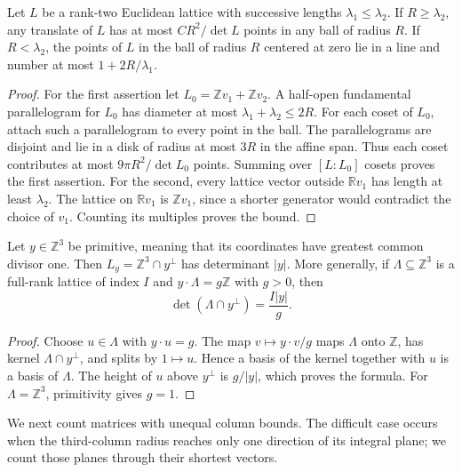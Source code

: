 \begin{lemma}\label{lat:plane-count}
Let $L$ be a rank-two Euclidean lattice with successive lengths
$\lambda_1\le\lambda_2$.  If $R\ge\lambda_2$, any translate of $L$ has
at most $C R^2/\det L$ points in any ball of radius $R$.
If $R<\lambda_2$, the points of $L$ in the ball of radius $R$ centered
at zero lie in a line and number at most $1+2R/\lambda_1$.
\end{lemma}

\begin{proof}
For the first assertion let $L_0=\mathbb Zv_1+\mathbb Zv_2$.
A half-open fundamental parallelogram for $L_0$ has diameter at most
$\lambda_1+\lambda_2\le2R$.  For each coset of $L_0$, attach such a
parallelogram to every point in the ball.  The parallelograms are
disjoint and lie in a disk of radius at most $3R$ in the affine span.
Thus each coset contributes at most $9\pi R^2/\det L_0$ points.
Summing over $[L:L_0]$ cosets proves the first assertion.
For the second, every lattice vector outside $\mathbb Rv_1$ has length
at least $\lambda_2$.  The lattice on $\mathbb Rv_1$ is
$\mathbb Zv_1$, since a shorter generator would contradict the choice
of $v_1$.  Counting its multiples proves the bound.
\end{proof}

\begin{lemma}\label{lat:plane-covolume}
Let $y\in\mathbb Z^3$ be primitive, meaning that its coordinates have
greatest common divisor one.  Then
$L_y=\mathbb Z^3\cap y^\perp$ has determinant $|y|$.
More generally, if $\Lambda\subseteq\mathbb Z^3$ is a full-rank lattice
of index $I$ and $y\cdot\Lambda=g\mathbb Z$ with $g>0$, then
\[
 \det(\Lambda\cap y^\perp)=\frac{I|y|}{g}.
\]
\end{lemma}

\begin{proof}
Choose $u\in\Lambda$ with $y\cdot u=g$.  The map
$v\mapsto y\cdot v/g$ maps $\Lambda$ onto $\mathbb Z$, has kernel
$\Lambda\cap y^\perp$, and splits by $1\mapsto u$.  Hence a basis of
the kernel together with $u$ is a basis of $\Lambda$.
The height of $u$ above $y^\perp$ is $g/|y|$, which proves the formula.
For $\Lambda=\mathbb Z^3$, primitivity gives $g=1$.
\end{proof}

We next count matrices with unequal column bounds.  The difficult case
occurs when the third-column radius reaches only one direction of its
integral plane; we count those planes through their shortest vectors.

